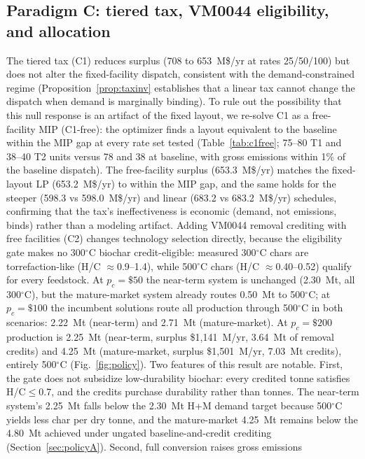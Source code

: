 \subsection{Paradigm C: tiered tax, VM0044 eligibility, and allocation}
\label{sec:policyC}

The tiered tax (C1) reduces surplus (708 to 653~M\$/yr at rates 25/50/100) but
does not alter the fixed-facility dispatch, consistent with the
demand-constrained regime (Proposition~\ref{prop:taxinv} establishes that a
linear tax cannot change the dispatch when demand is marginally binding).
To rule out the possibility that this null response
is an artifact of the fixed layout, we re-solve C1 as a free-facility MIP
(C1-free): the optimizer finds a layout equivalent to the baseline within the
MIP gap at every rate set tested (Table~\ref{tab:c1free}; 75--80 T1 and
38--40 T2 units versus 78 and 38 at baseline, with gross emissions within
1\% of the baseline dispatch). The free-facility surplus (653.3~M\$/yr)
matches the fixed-layout LP (653.2~M\$/yr) to within the MIP gap, and the same
holds for the steeper (598.3 vs 598.0~M\$/yr) and linear (683.2 vs
683.2~M\$/yr) schedules, confirming that the tax's ineffectiveness
is economic (demand, not emissions, binds) rather than a modeling
artifact. Adding VM0044 removal crediting with free facilities (C2) changes
technology selection directly, because the eligibility gate makes
no 300$^\circ$C biochar credit-eligible: measured 300$^\circ$C chars are
torrefaction-like (H/C $\approx$0.9--1.4), while 500$^\circ$C chars
(H/C $\approx$0.40--0.52) qualify for every feedstock. At $p_c=\$50$ the
near-term system is unchanged (2.30~Mt, all 300$^\circ$C), but the
mature-market system already routes 0.50~Mt to 500$^\circ$C; at
$p_c=\$100$ the incumbent solutions route all production through 500$^\circ$C
in both scenarios: 2.22~Mt
(near-term) and 2.71~Mt (mature-market). At
$p_c=\$200$ production is 2.25~Mt (near-term, surplus \$1{,}141~M/yr, 3.64~Mt
of removal credits) and 4.25~Mt (mature-market, surplus \$1{,}501~M/yr,
7.03~Mt credits), entirely 500$^\circ$C (Fig.~\ref{fig:policy}). Two features
of this result are notable. First, the gate does not subsidize
low-durability biochar: every credited tonne satisfies H/C$\le$0.7, and the
credits purchase durability rather than tonnes. The near-term system's
2.25~Mt falls below the 2.30~Mt H+M demand target because 500$^\circ$C
yields less char per dry tonne, and the mature-market 4.25~Mt remains below
the 4.80~Mt achieved under ungated baseline-and-credit crediting
(Section~\ref{sec:policyA}). Second, full conversion raises gross emissions
